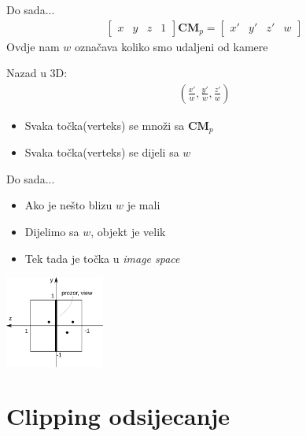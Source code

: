 \documentclass[9pt]{beamer}
\begin{document}
\begin{frame}{Do sada...}
	\begin{align*}
	\left[ \begin{array}{cccc}x & y & z & 1 \end{array} \right]  \mathbf{C}\mathbf{M}_p = \left[ \begin{array}{cccc}x' & y' & z' & w \end{array} \right]
	\end{align*}
	Ovdje nam $w$ označava koliko smo udaljeni od kamere
	
	Nazad u 3D: 
	\begin{align*}
	\left(\frac{x'}{w}, \frac{y'}{w}, \frac{z'}{w}\right) 
	\end{align*}
	
	\begin{itemize}
		\item Svaka točka(verteks) se množi sa $\mathbf{C}\mathbf{M}_p$
		\item Svaka točka(verteks) se dijeli sa $w$
	\end{itemize}
\end{frame}


\begin{frame}{Do sada...}
	\begin{itemize}
		\item Ako je nešto blizu $w$ je mali
		\item Dijelimo sa $w$, objekt je velik
		\item Tek tada je točka u \textit{image space}
	\end{itemize}
	
	\begin{center}
		\includegraphics[height=3cm]{slike/p05_01.png}
	\end{center}
\end{frame}

\section{Clipping \tiny{odsijecanje}}
\end{document}
